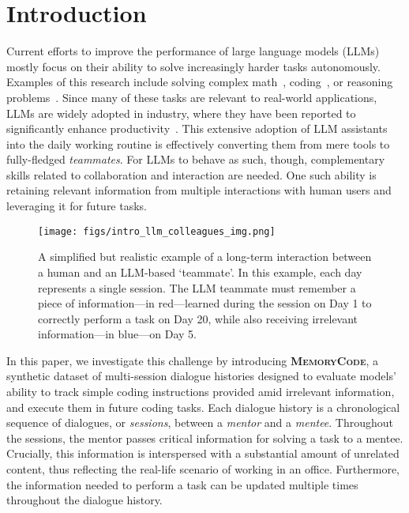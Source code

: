 \section{Introduction}
\label{sec:intro}


Current efforts to improve the performance of large language models (LLMs) mostly focus on their ability to solve increasingly harder tasks autonomously. Examples of this research include solving complex math~\cite{wangmathcoder,gao2024omni,alphageo2021}, coding~\cite{chen2021evaluating,austin2021program,tao2024crystal,puerto-etal-2024-code}, or reasoning problems~\cite{hao2023reasoning,wang2024chain,renze2024self}.
Since many of these tasks are relevant to real-world applications, LLMs are widely adopted in industry, where they have been reported to significantly enhance productivity~\cite{weber2024significant,cambon2023early}.
This extensive adoption of LLM assistants into the daily working routine is effectively converting them from mere tools to fully-fledged \textit{teammates}. 
For LLMs to behave as such, though, complementary skills related to collaboration and interaction are needed. 
One such ability is retaining relevant information from multiple interactions with human users
and leveraging it for future tasks.


\begin{figure}[t]
    \centering
    
    \texttt{[image: figs/intro\_llm\_colleagues\_img.png]}
    \caption{A simplified but realistic example of a long-term interaction between a human and an LLM-based `teammate'. 
    In this example, each day represents a single session. The LLM teammate must remember a piece of information---in red---learned during the session on Day 1 to correctly perform a task on Day 20, while also receiving irrelevant information---in blue---on Day 5. 
    }
    \label{fig:memoryCode_fig1_sketch}
\end{figure}

In this paper, we investigate this challenge by introducing \textbf{\textsc{MemoryCode}}, 
a synthetic dataset 
of multi-session dialogue histories 
designed to evaluate models' ability to 
track simple coding instructions provided amid irrelevant information, and execute them in future coding tasks.
Each dialogue history is a chronological sequence of dialogues, or \textit{sessions}, between a \textit{mentor} and a \textit{mentee}.
Throughout the sessions, the mentor passes critical information for solving a task to a mentee. Crucially, this information is interspersed with a substantial amount of unrelated content, thus reflecting the real-life scenario of working in an office. 
Furthermore, the information needed to perform a task can be updated multiple times throughout the dialogue history.


